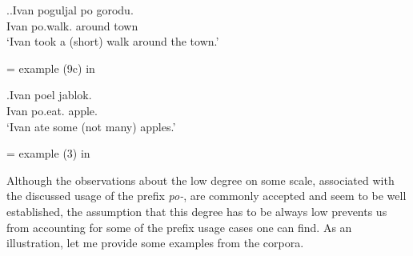 \ex.\label{ex:po:delim}\ag.\label{ex:po:delim1}Ivan poguljal po gorodu.\\
Ivan po.walk. around town\\
\vspace{0.5em}
`Ivan took a (short) walk around the town.'
\begin{flushright}
\vspace{-0.5em}
= example (9c) in \citealt{Filip:00}
\end{flushright}
\bg.\label{ex:po:delim2}Ivan poel jablok.\\
Ivan po.eat. apple.\\
\vspace{0.5em}
`Ivan ate some (not many) apples.'
\begin{flushright}
\vspace{-0.5em}
= example (3) in \citealt[46]{Kagan:book}
\end{flushright}


Although the observations about the low degree on some scale, associated with the discussed usage of the prefix \textit{po-}, are commonly accepted and seem to be well established, the assumption that this degree has to be always low prevents us from accounting for some of the prefix usage cases one can find. As an illustration, let me provide some examples from the corpora.

